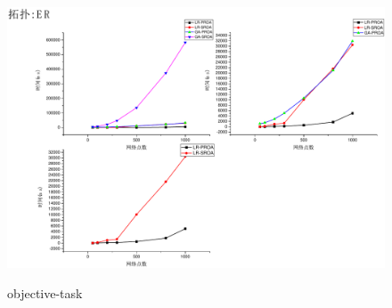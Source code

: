 \begin{figure}
\setlength{\belowcaptionskip}{-0.1cm}
  \begin{center}
    {\includegraphics[width=1 \textwidth]{figures/TI-ER-NO.pdf}}
    \end{center}
  \caption{{\footnotesize{objective-task}}}
  \label{IterNum}
\end{figure}
